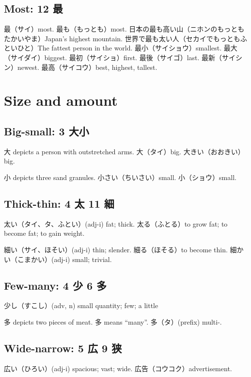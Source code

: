\subsection{Most: 12 最}

最（サイ）most.
最も（もっとも）most.
日本の最も高い山（ニホンのもっともたかいやま）Japan's highest mountain.
世界で最も太い人（セカイでもっともふといひと）The fattest person in the world.
最小（サイショウ）smallest.
最大（サイダイ）biggest.
最初（サイショ）first.
最後（サイゴ）last.
最新（サイシン）newest.
最高（サイコウ）best, highest, tallest.

\section{Size and amount}

\subsection{Big-small: 3 大小}

大 depicts a person with outstretched arms.
大（タイ）big.
大きい（おおきい）big.

小 depicts three sand granules.
小さい（ちいさい）small.
小（ショウ）small.

\subsection{Thick-thin: 4 太 11 細}

太い（タイ、タ、ふとい）(adj-i) fat; thick.
太る（ふとる）to grow fat; to become fat; to gain weight.

細い（サイ、ほそい）(adj-i) thin; slender.
細る（ほそる）to become thin.
細かい（こまかい）(adj-i) small; trivial.

\subsection{Few-many: 4 少 6 多}

少し（すこし）(adv, n) small quantity; few; a little

多 depicts two pieces of meat.
多 means ``many''.
多（タ）(prefix) multi-.

\subsection{Wide-narrow: 5 広 9 狭}

広い（ひろい）(adj-i) spacious; vast; wide.
広告（コウコク）advertisement.

